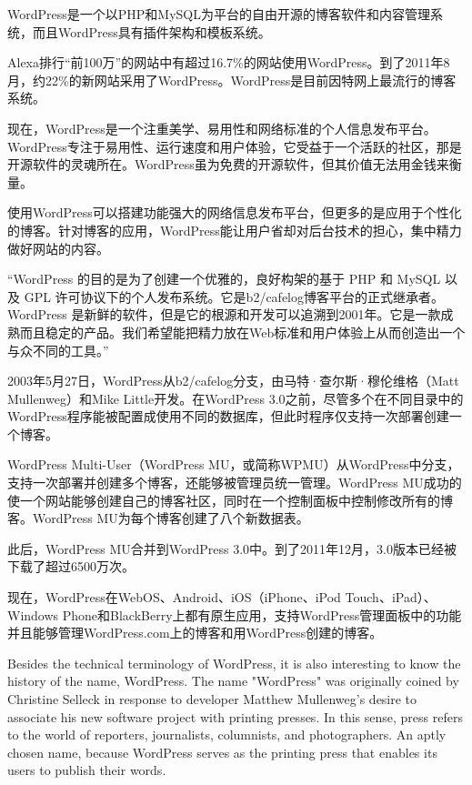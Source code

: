 WordPress\cite{wp_wiki}是一个以PHP和MySQL为平台的自由开源的博客软件和内容管理系统，而且WordPress具有插件架构和模板系统。

Alexa排行“前100万”的网站中有超过16.7\%的网站使用WordPress。到了2011年8月，约22\%的新网站采用了WordPress。WordPress是目前因特网上最流行的博客系统。

现在，WordPress是一个注重美学、易用性和网络标准的个人信息发布平台。WordPress专注于易用性、运行速度和用户体验，它受益于一个活跃的社区，那是开源软件的灵魂所在。WordPress虽为免费的开源软件，但其价值无法用金钱来衡量。

使用WordPress可以搭建功能强大的网络信息发布平台，但更多的是应用于个性化的博客。针对博客的应用，WordPress能让用户省却对后台技术的担心，集中精力做好网站的内容。

\begin{shaded}
\noindent “WordPress 的目的是为了创建一个优雅的，良好构架的基于 PHP 和 MySQL 以及 GPL 许可协议下的个人发布系统。它是b2/cafelog博客平台的正式继承者。WordPress 是新鲜的软件，但是它的根源和开发可以追溯到2001年。它是一款成熟而且稳定的产品。我们希望能把精力放在Web标准和用户体验上从而创造出一个与众不同的工具。”
\end{shaded}

2003年5月27日，WordPress从b2/cafelog分支，由马特·查尔斯·穆伦维格（Matt Mullenweg）和Mike Little开发。在WordPress 3.0之前，尽管多个在不同目录中的WordPress程序能被配置成使用不同的数据库，但此时程序仅支持一次部署创建一个博客。

WordPress Multi-User（WordPress MU，或简称WPMU）从WordPress中分支，支持一次部署并创建多个博客，还能够被管理员统一管理。WordPress MU成功的使一个网站能够创建自己的博客社区，同时在一个控制面板中控制修改所有的博客。WordPress MU为每个博客创建了八个新数据表。

此后，WordPress MU合并到WordPress 3.0中。到了2011年12月，3.0版本已经被下载了超过6500万次。

现在，WordPress在WebOS、Android、iOS（iPhone、iPod Touch、iPad）、Windows Phone和BlackBerry上都有原生应用，支持WordPress管理面板中的功能并且能够管理WordPress.com上的博客和用WordPress创建的博客。







Besides the technical terminology of WordPress, it is also interesting to know the history of the name, WordPress. The name "WordPress" was originally coined by Christine Selleck in response to developer Matthew Mullenweg's desire to associate his new software project with printing presses. In this sense, press refers to the world of reporters, journalists, columnists, and photographers. An aptly chosen name, because WordPress serves as the printing press that enables its users to publish their words.

